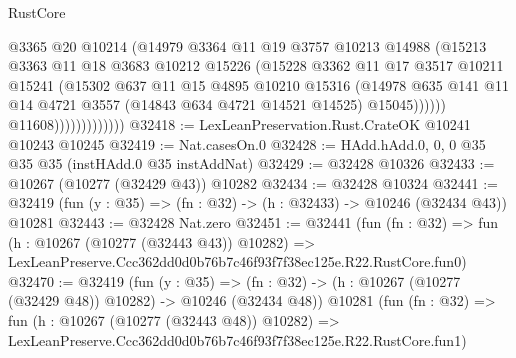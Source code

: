 \begin{lexlean}{RustCore}
\begin{coremodule}
                                @3365
                                @20
                                @10214
                                (@14979
                                  @3364
                                  @11
                                  @19
                                  @3757
                                  @10213
                                  @14988
                                  (@15213
                                    @3363
                                    @11
                                    @18
                                    @3683
                                    @10212
                                    @15226
                                    (@15228
                                      @3362
                                      @11
                                      @17
                                      @3517
                                      @10211
                                      @15241
                                      (@15302
                                        @637
                                        @11
                                        @15
                                        @4895
                                        @10210
                                        @15316
                                        (@14978
                                          @635
                                          @141
                                          @11
                                          @14
                                          @4721
                                          @3557
                                          (@14843 @634 @4721 @14521 @14525)
                                          @15045))))))
                              @11608)))))))))))))
@32418 := LexLeanPreservation.Rust.CrateOK @10241 @10243 @10245
@32419 := Nat.casesOn.{0}
@32428 := HAdd.hAdd.{0, 0, 0} @35 @35 @35 (instHAdd.{0} @35 instAddNat)
@32429 := @32428 @10326
@32433 := @10267 (@10277 (@32429 @43)) @10282
@32434 := @32428 @10324
@32441 := @32419 (fun (y : @35) => (fn : @32) -> (h : @32433) -> @10246 (@32434 @43)) @10281
@32443 := @32428 Nat.zero
@32451 := @32441
    (fun (fn : @32) =>
    fun (h : @10267 (@10277 (@32443 @43)) @10282) =>
    LexLeanPreserve.Ccc362dd0d0b76b7c46f93f7f38ec125e.R22.RustCore.fun0)
@32470 := @32419
    (fun (y : @35) =>
    (fn : @32) -> (h : @10267 (@10277 (@32429 @48)) @10282) -> @10246 (@32434 @48))
    @10281
    (fun (fn : @32) =>
    fun (h : @10267 (@10277 (@32443 @48)) @10282) =>
    LexLeanPreserve.Ccc362dd0d0b76b7c46f93f7f38ec125e.R22.RustCore.fun1)

\end{coremodule}
\end{lexlean}
